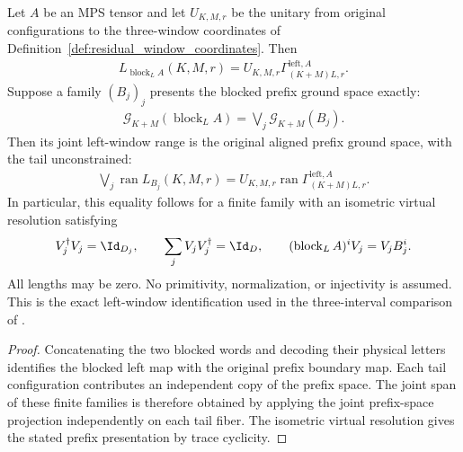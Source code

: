 \begin{lemma}
    \label{thm:residual_window_left_original_ground_space}
    \leanok
    Let $A$ be an MPS tensor and let $U_{K,M,r}$ be the unitary from original
    configurations to the three-window coordinates of
    Definition~\ref{def:residual_window_coordinates}. Then
    \begin{align}
        L_{\operatorname{block}_L A}(K,M,r)
        =U_{K,M,r}\Gamma^{\mathrm{left},A}_{(K+M)L,r}.
    \end{align}
    Suppose a family $(B_j)_j$ presents the blocked prefix ground space exactly:
    \begin{align}
        \mathcal G_{K+M}(\operatorname{block}_L A)
        =\bigvee_j\mathcal G_{K+M}(B_j).
    \end{align}
    Then its joint left-window range is the original aligned prefix ground space,
    with the tail unconstrained:
    \begin{align}
        \bigvee_j\operatorname{ran}L_{B_j}(K,M,r)
        =U_{K,M,r}\operatorname{ran}\Gamma^{\mathrm{left},A}_{(K+M)L,r}.
    \end{align}
    In particular, this equality follows for a finite family with an isometric
    virtual resolution satisfying
    \begin{align}
        V_j^\dagger V_j=\Id_{D_j},\qquad
        \sum_jV_jV_j^\dagger=\Id_D,\qquad
        (\operatorname{block}_L A)^iV_j=V_jB_j^i.
    \end{align}
    All lengths may be zero. No primitivity, normalization, or injectivity is
    assumed. This is the exact left-window identification used in the
    three-interval comparison of
    \cite[Lemma~commutation(ii)]{Nachtergaele1996Spectral}.
\end{lemma}
\begin{proof}\leanok
    Concatenating the two blocked words and decoding their physical letters
    identifies the blocked left map with the original prefix boundary map.
    Each tail configuration contributes an independent copy of the prefix
    space. The joint span of these finite families is therefore obtained by
    applying the joint prefix-space projection independently on each tail
    fiber. The isometric virtual resolution gives the stated prefix
    presentation by trace cyclicity.
\end{proof}

